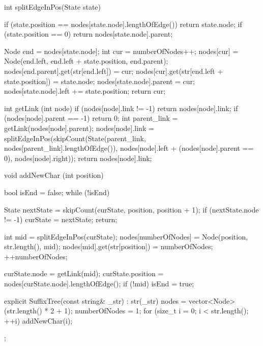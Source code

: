 \documentclass[12pt, titlepage]{article}
\begin{document}
\begin{cppcode}
{    int splitEdgeInPos(State state) {
        if (state.position == nodes[state.node].lengthOfEdge())
            return state.node;
        if (state.position == 0)
            return nodes[state.node].parent;

        Node end = nodes[state.node];
        int cur = numberOfNodes++;
        nodes[cur] = Node(end.left, end.left + state.position, end.parent);
        nodes[end.parent].get(str[end.left]) = cur;
        nodes[cur].get(str[end.left + state.position]) = state.node;
        nodes[state.node].parent = cur;
        nodes[state.node].left += state.position;
        return cur;
    }    

    int getLink (int node) {
        if (nodes[node].link != -1)
            return nodes[node].link;
        if (nodes[node].parent == -1)
            return 0;
        int parent_link = getLink(nodes[node].parent);
        nodes[node].link = splitEdgeInPos(skipCount(State(parent_link,  
                                    nodes[parent_link].lengthOfEdge()), 
                                    nodes[node].left + (nodes[node].parent == 0), 
                                    nodes[node].right));
        return nodes[node].link;
    }
     
    void addNewChar (int position) {
        bool isEnd = false;
        while (!isEnd) {
            State nextState = skipCount(curState, position, position + 1);
            if (nextState.node != -1) {
                curState = nextState;
                return;
            }

            int mid = splitEdgeInPos(curState);
            nodes[numberOfNodes] = Node(position, str.length(), mid);
            nodes[mid].get(str[position]) = numberOfNodes;
            ++numberOfNodes;
     
            curState.node = getLink(mid);
            curState.position = nodes[curState.node].lengthOfEdge();
            if (!mid)
                isEnd = true;
        }
    }

    explicit SuffixTree(const string& _str) : str(_str) {
        nodes = vector<Node> (str.length() * 2 + 1);
        numberOfNodes = 1;
        for (size_t i = 0; i < str.length(); ++i) {
            addNewChar(i);
        }
    }    
};
\end{cppcode}
\end{document}
